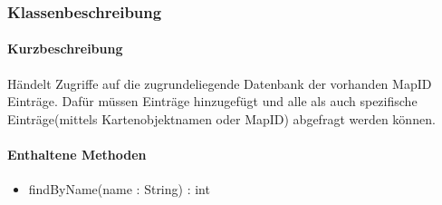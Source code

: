 \subsubsection*{Klassenbeschreibung}%
\paragraph*{Kurzbeschreibung}
Händelt Zugriffe auf die zugrundeliegende Datenbank der vorhanden MapID Einträge.
Dafür müssen Einträge hinzugefügt und alle als auch spezifische Einträge(mittels Kartenobjektnamen oder MapID) 
abgefragt werden können.
\paragraph*{Enthaltene Methoden}
\begin{itemize}
    \item findByName(name : String) : int
\end{itemize}
